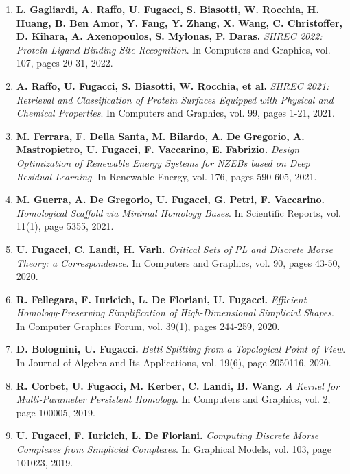 \documentclass[11pt]{article}
\begin{document}
\begin{enumerate}

\item{\bf L. Gagliardi, A. Raffo, U. Fugacci, S. Biasotti, W. Rocchia, H. Huang, B. Ben Amor, Y. Fang, Y. Zhang, X. Wang, C. Christoffer, D. Kihara, A. Axenopoulos, S. Mylonas, P. Daras.} {\em SHREC 2022: Protein-Ligand Binding Site Recognition}. In Computers and Graphics, vol. 107, pages 20-31, 2022.

\item {\bf A. Raffo, U. Fugacci, S. Biasotti, W. Rocchia, et al.} {\em SHREC 2021: Retrieval and Classification of Protein Surfaces Equipped with Physical and Chemical Properties}. In Computers and Graphics, vol. 99, pages 1-21, 2021.

\item {\bf M. Ferrara, F. Della Santa, M. Bilardo, A. De Gregorio, A. Mastropietro, U. Fugacci, F. Vaccarino, E. Fabrizio.} {\em Design Optimization of Renewable Energy Systems for NZEBs based on Deep Residual Learning}. In Renewable Energy, vol. 176, pages 590-605, 2021.

\item {\bf M. Guerra, A. De Gregorio, U. Fugacci, G. Petri, F. Vaccarino.} {\em Homological Scaffold via Minimal Homology Bases}. In Scientific Reports, vol. 11(1), page 5355, 2021.

\item {\bf U. Fugacci, C. Landi, H. Varl{\i}.} {\em Critical Sets of PL and Discrete Morse Theory: a Correspondence}. In Computers and Graphics, vol. 90, pages 43-50, 2020.

\item {\bf R. Fellegara, F. Iuricich, L. De Floriani, U. Fugacci.} {\em Efficient Homology-Preserving Simplification of High-Dimensional Simplicial Shapes}. In Computer Graphics Forum, vol. 39(1), pages 244-259, 2020.

\item {\bf D. Bolognini, U. Fugacci.} {\em Betti Splitting from a Topological Point of View}. In Journal of Algebra and Its Applications, vol. 19(6), page 2050116, 2020.

\item {\bf R. Corbet, U. Fugacci, M. Kerber, C. Landi, B. Wang.} {\em A Kernel for Multi-Parameter Persistent Homology}. In Computers and Graphics, vol. 2, page 100005, 2019.

\item {\bf U. Fugacci, F. Iuricich, L. De Floriani.} {\em Computing Discrete Morse Complexes from Simplicial Complexes}. In Graphical Models, vol. 103, page 101023, 2019.


\end{enumerate}
\end{document}
